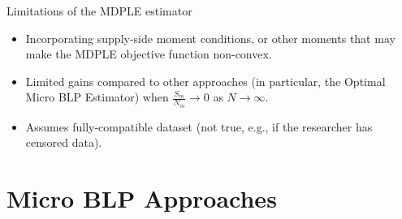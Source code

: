 

\begin{frame}{Limitations of the MDPLE estimator}
    
    \begin{itemize}

        \item Incorporating supply-side moment conditions, or other moments that may make the MDPLE objective function non-convex.
        \item Limited gains compared to other approaches (in particular, the Optimal Micro BLP Estimator) when $\frac{S_m}{N_m}\to 0$ as $N\to\infty$.
        \item Assumes fully-compatible dataset (not true, e.g., if the researcher has censored data).
    \end{itemize}
\end{frame}



\section*{Micro BLP Approaches}

